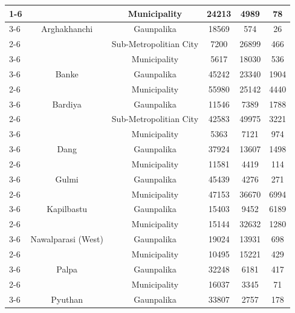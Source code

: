 \documentclass[
  letterpaper,
  DIV=11,
  numbers=noendperiod]{scrartcl}
\begin{document}
\begin{longtable}[t]{>{}lccccc}
\cmidrule{1-6}\pagebreak[0]
 &  & Municipality & 24213 & 4989 & 78\\
\cmidrule{3-6}\nopagebreak
 & \multirow[t]{-2}{*}{\centering\arraybackslash Arghakhanchi} & Gaunpalika & 18569 & 574 & 26\\
\cmidrule{2-6}\nopagebreak
 &  & Sub-Metropolitian City & 7200 & 26899 & 466\\
\cmidrule{3-6}\nopagebreak
 &  & Municipality & 5617 & 18030 & 536\\
\cmidrule{3-6}\nopagebreak
 & \multirow[t]{-3}{*}{\centering\arraybackslash Banke} & Gaunpalika & 45242 & 23340 & 1904\\
\cmidrule{2-6}\nopagebreak
 &  & Municipality & 55980 & 25142 & 4440\\
\cmidrule{3-6}\nopagebreak
 & \multirow[t]{-2}{*}{\centering\arraybackslash Bardiya} & Gaunpalika & 11546 & 7389 & 1788\\
\cmidrule{2-6}\nopagebreak
 &  & Sub-Metropolitian City & 42583 & 49975 & 3221\\
\cmidrule{3-6}\nopagebreak
 &  & Municipality & 5363 & 7121 & 974\\
\cmidrule{3-6}\nopagebreak
 & \multirow[t]{-3}{*}{\centering\arraybackslash Dang} & Gaunpalika & 37924 & 13607 & 1498\\
\cmidrule{2-6}\nopagebreak
 &  & Municipality & 11581 & 4419 & 114\\
\cmidrule{3-6}\nopagebreak
 & \multirow[t]{-2}{*}{\centering\arraybackslash Gulmi} & Gaunpalika & 45439 & 4276 & 271\\
\cmidrule{2-6}\nopagebreak
 &  & Municipality & 47153 & 36670 & 6994\\
\cmidrule{3-6}\nopagebreak
 & \multirow[t]{-2}{*}{\centering\arraybackslash Kapilbastu} & Gaunpalika & 15403 & 9452 & 6189\\
\cmidrule{2-6}\nopagebreak
 &  & Municipality & 15144 & 32632 & 1280\\
\cmidrule{3-6}\nopagebreak
 & \multirow[t]{-2}{*}{\centering\arraybackslash Nawalparasi (West)} & Gaunpalika & 19024 & 13931 & 698\\
\cmidrule{2-6}\nopagebreak
 &  & Municipality & 10495 & 15221 & 429\\
\cmidrule{3-6}\nopagebreak
 & \multirow[t]{-2}{*}{\centering\arraybackslash Palpa} & Gaunpalika & 32248 & 6181 & 417\\
\cmidrule{2-6}\nopagebreak
 &  & Municipality & 16037 & 3345 & 71\\
\cmidrule{3-6}\nopagebreak
 & \multirow[t]{-2}{*}{\centering\arraybackslash Pyuthan} & Gaunpalika & 33807 & 2757 & 178\\

\end{longtable}
\end{document}
